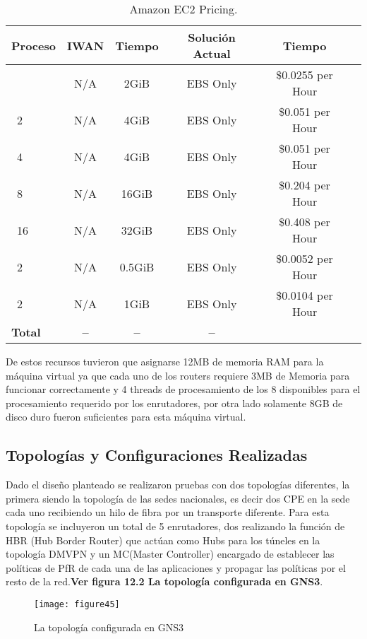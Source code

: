 \begin{table}[ht]
	\caption{Amazon EC2 Pricing.}
	\label{tab:hla:results}
\centering
\begin{tabular}{lccccc}
	\toprule
	\multicolumn{1}{c}{\textbf{Proceso}} 	& \textbf{IWAN}	& \textbf{Tiempo}	& \textbf{Solución Actual}
	& \textbf{Tiempo}\\
	\midrule
\cite{Aprovisionamiento tienda nueva} 		& N/A & 2GiB & EBS Only	& \$0.0255 per Hour \\
\cite{a1.large}~2 		& N/A & 4GiB & EBS Only & \$0.051 per Hour	\\
\cite{a1.xlarge}~4		& N/A & 4GiB & EBS Only & \$0.051 per Hour	\\
\cite{a1.2xlarge}~8 	& N/A & 16GiB & EBS Only & \$0.204 per Hour	\\
\cite{a1.4xlarge}~16	& N/A & 32GiB & EBS Only & \$0.408 per Hour	\\
\cite{t3.nano}~2		& N/A & 0.5GiB & EBS Only & \$0.0052 per Hour	\\
\cite{t3.micro}~2   	& N/A & 1GiB & EBS Only & \$0.0104 per Hour	\\
	\midrule
	\textbf{Total}			& \textbf{--}		& \textbf{--}		& \textbf{--} \\
	\bottomrule
\end{tabular}
\end{table}

De estos recursos tuvieron que asignarse 12MB de memoria RAM para la máquina virtual ya que cada uno de los routers requiere 3MB de Memoria para funcionar correctamente y 4 threads de procesamiento de los 8 disponibles para el procesamiento requerido por los enrutadores, por otra lado solamente 8GB de disco duro fueron suficientes para esta máquina virtual.

\subsection{Topologías y Configuraciones Realizadas} %
\label{sec:Topologías y Configuraciones Realizadas}

Dado el diseño planteado se realizaron pruebas con dos topologías diferentes, la primera siendo la topología de las sedes nacionales, es decir dos CPE en la sede cada uno recibiendo un hilo de fibra por un transporte diferente. Para esta topología se incluyeron un total de 5 enrutadores, dos realizando la función de HBR (Hub Border Router) que actúan como Hubs para los túneles en la topología DMVPN y un MC(Master Controller) encargado de establecer las políticas de PfR de cada una de las aplicaciones y propagar las políticas por el resto de la red.\textbf{Ver figura 12.2 La topología configurada en GNS3}.
\begin{figure}[htbp]
  \centering
    {\texttt{[image: figure45]}}%
  \caption{La topología configurada en GNS3 }
  \label{fig:fig2subfig}
\end{figure}

